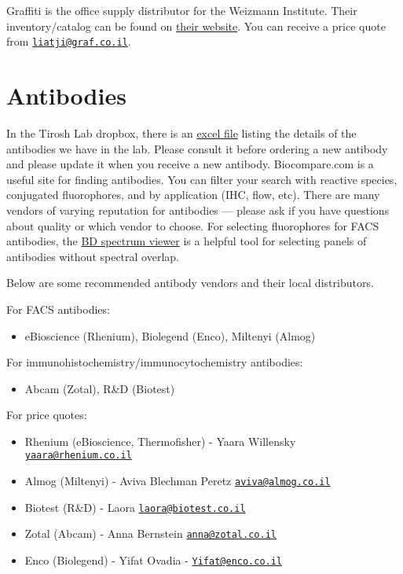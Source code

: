 \documentclass[]{book}
\providecommand{\tightlist}{%
  \setlength{\itemsep}{0pt}\setlength{\parskip}{0pt}}
\begin{document}
Graffiti is the office supply distributor for the Weizmann Institute.
Their inventory/catalog can be found on
\href{https://www.graffiti-online.co.il/}{their website}. You can
receive a price quote from
\href{mailto:liatji@graf.co.il}{\nolinkurl{liatji@graf.co.il}}.

\section{Antibodies}\label{antibodies}

In the Tirosh Lab dropbox, there is an
\href{https://www.dropbox.com/s/8fr2p795g5zgepz/antibodies_Tirosh.xlsx?dl=0}{excel
file} listing the details of the antibodies we have in the lab. Please
consult it before ordering a new antibody and please update it when you
receive a new antibody. Biocompare.com is a useful site for finding
antibodies. You can filter your search with reactive species, conjugated
fluorophores, and by application (IHC, flow, etc). There are many
vendors of varying reputation for antibodies --- please ask if you have
questions about quality or which vendor to choose. For selecting
fluorophores for FACS antibodies, the
\href{https://www.bdbiosciences.com/en-us/applications/research-applications/multicolor-flow-cytometry/product-selection-tools/spectrum-viewer}{BD
spectrum viewer} is a helpful tool for selecting panels of antibodies
without spectral overlap.

Below are some recommended antibody vendors and their local
distributors.

For FACS antibodies:

\begin{itemize}
\tightlist
\item
  eBioscience (Rhenium), Biolegend (Enco), Miltenyi (Almog)
\end{itemize}

For immunohistochemistry/immunocytochemistry antibodies:

\begin{itemize}
\tightlist
\item
  Abcam (Zotal), R\&D (Biotest)
\end{itemize}

For price quotes:

\begin{itemize}
\tightlist
\item
  Rhenium (eBioscience, Thermofisher) - Yaara Willensky
  \href{mailto:yaara@rhenium.co.il}{\nolinkurl{yaara@rhenium.co.il}}
\item
  Almog (Miltenyi) - Aviva Blechman Peretz
  \href{mailto:aviva@almog.co.il}{\nolinkurl{aviva@almog.co.il}}
\item
  Biotest (R\&D) - Laora
  \href{mailto:laora@biotest.co.il}{\nolinkurl{laora@biotest.co.il}}
\item
  Zotal (Abcam) - Anna Bernstein
  \href{mailto:anna@zotal.co.il}{\nolinkurl{anna@zotal.co.il}}
\item
  Enco (Biolegend) - Yifat Ovadia -
  \href{mailto:Yifat@enco.co.il}{\nolinkurl{Yifat@enco.co.il}}
\end{itemize}
\end{document}
